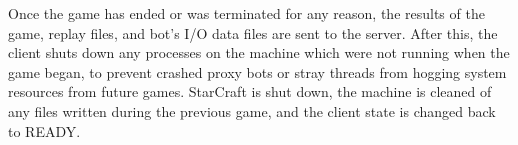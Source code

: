 Once the game has ended or was terminated for any reason, the results of the game, replay files, and bot's I/O data files are sent to the server. After this, the client shuts down any processes on the machine which were not running when the game began, to prevent crashed proxy bots or stray threads from hogging system resources from future games. StarCraft is shut down, the machine is cleaned of any files written during the previous game, and the client state is changed back to READY.

